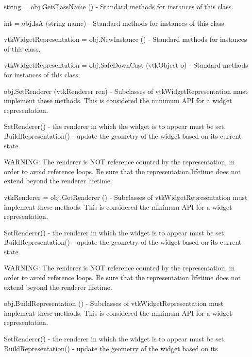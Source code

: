 \begin{DoxyItemize}
\item {\ttfamily string = obj.\-Get\-Class\-Name ()} -\/ Standard methods for instances of this class.  
\item {\ttfamily int = obj.\-Is\-A (string name)} -\/ Standard methods for instances of this class.  
\item {\ttfamily vtk\-Widget\-Representation = obj.\-New\-Instance ()} -\/ Standard methods for instances of this class.  
\item {\ttfamily vtk\-Widget\-Representation = obj.\-Safe\-Down\-Cast (vtk\-Object o)} -\/ Standard methods for instances of this class.  
\item {\ttfamily obj.\-Set\-Renderer (vtk\-Renderer ren)} -\/ Subclasses of vtk\-Widget\-Representation must implement these methods. This is considered the minimum A\-P\-I for a widget representation. 
\begin{DoxyPre}
 SetRenderer() - the renderer in which the widget is to appear must be set.
 BuildRepresentation() - update the geometry of the widget based on its
                         current state.
 \end{DoxyPre}
 W\-A\-R\-N\-I\-N\-G\-: The renderer is N\-O\-T reference counted by the representation, in order to avoid reference loops. Be sure that the representation lifetime does not extend beyond the renderer lifetime.  
\item {\ttfamily vtk\-Renderer = obj.\-Get\-Renderer ()} -\/ Subclasses of vtk\-Widget\-Representation must implement these methods. This is considered the minimum A\-P\-I for a widget representation. 
\begin{DoxyPre}
 SetRenderer() - the renderer in which the widget is to appear must be set.
 BuildRepresentation() - update the geometry of the widget based on its
                         current state.
 \end{DoxyPre}
 W\-A\-R\-N\-I\-N\-G\-: The renderer is N\-O\-T reference counted by the representation, in order to avoid reference loops. Be sure that the representation lifetime does not extend beyond the renderer lifetime.  
\item {\ttfamily obj.\-Build\-Representation ()} -\/ Subclasses of vtk\-Widget\-Representation must implement these methods. This is considered the minimum A\-P\-I for a widget representation. 
\begin{DoxyPre}
 SetRenderer() - the renderer in which the widget is to appear must be set.
 BuildRepresentation() - update the geometry of the widget based on its

\end{DoxyPre}
\end{DoxyItemize}
